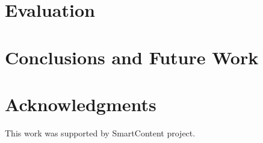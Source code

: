 \documentclass{llncs}
\begin{document}
\section{Evaluation}\label{sec:Evaluation}



\section{Conclusions and Future Work}\label{sec:Conclusions}





\section*{Acknowledgments}

This work was supported by SmartContent project.



%






\clearpage
{} %
\renewcommand{\indexname}{Author Index}
\printindex \clearpage
{} %
\renewcommand{\indexname}{Subject Index}
%
\end{document}
